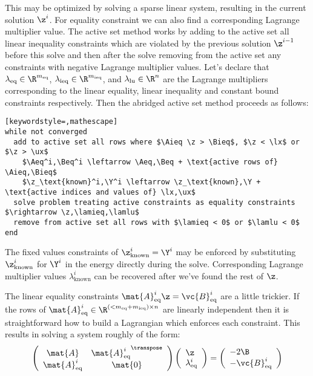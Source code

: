 \documentclass{diary}
\renewcommand{\A}{\mat{A}}
\newcommand{\Aeq}{\mat{A}_\textrm{eq}}
\newcommand{\Aieq}{\mat{A}_\textrm{ieq}}
\newcommand{\Beq}{\vc{B}_\textrm{eq}}
\newcommand{\Bieq}{\vc{B}_\textrm{ieq}}
\newcommand{\lx}{\Bell}
\newcommand{\ux}{\vc{u}}
\newcommand{\lameq} {\lambda_\textrm{eq}}
\newcommand{\lamieq}{\lambda_\textrm{ieq}}
\newcommand{\lamlu}  {\lambda_\textrm{lu}}
\begin{document}
This may be optimized by solving a sparse linear system, resulting in the
current solution $\z^i$. For equality constraint we can also find a
corresponding Lagrange multiplier value. The active set method works by adding
to the active set all linear inequality constraints which are violated by the
previous solution $\z^{i-1}$ before this solve and then after the solve
removing from the active set any constraints with negative Lagrange multiplier
values. Let's declare that $\lameq \in \R^{m_\text{eq}}$, $\lamieq \in
\R^{m_\text{ieq}}$, and $\lamlu \in \R^{n}$ are the Lagrange multipliers
corresponding to the linear equality, linear inequality and constant bound
constraints respectively. Then the abridged active set method proceeds as
follows:

\begin{lstlisting}[keywordstyle=,mathescape]
while not converged
  add to active set all rows where $\Aieq \z > \Bieq$, $\z < \lx$ or $\z > \ux$
    $\Aeq^i,\Beq^i \leftarrow \Aeq,\Beq + \text{active rows of} \Aieq,\Bieq$
    $\z_\text{known}^i,\Y^i \leftarrow \z_\text{known},\Y + \text{active indices and values of} \lx,\ux$
  solve problem treating active constraints as equality constraints $\rightarrow \z,\lamieq,\lamlu$
  remove from active set all rows with $\lamieq < 0$ or $\lamlu < 0$
end
\end{lstlisting}

The fixed values constraints of $\z_\text{known}^i = \Y^i$ may be enforced by
substituting $\z_\text{known}^i$ for $\Y^i$ in the energy directly during the
solve.  Corresponding Lagrange multiplier values $\lambda_\text{known}^i$ can
be recovered after we've found the rest of $\z$.

The linear equality constraints $\Aeq^i \z = \Beq^i$ are a little trickier. If
the rows of 
$\Aeq^i \in \R^{(<m_\text{eq}+ m_\text{ieq}) \times n}$ are linearly
independent then it is straightforward how to build a Lagrangian which enforces
each constraint. This results in solving a system roughly of the form:
\begin{equation}
\left(
\begin{array}{cc}
\A      & {\Aeq^i}^\transpose \\
\Aeq^i  & \mat{0}
\end{array}
\right)
\left(
\begin{array}{l}
\z\\\lambda^i_\text{eq}
\end{array}
\right)
=
\left(
\begin{array}{l}
-2\B\\
-\Beq^i
\end{array}
\right)
\end{equation}
\end{document}
